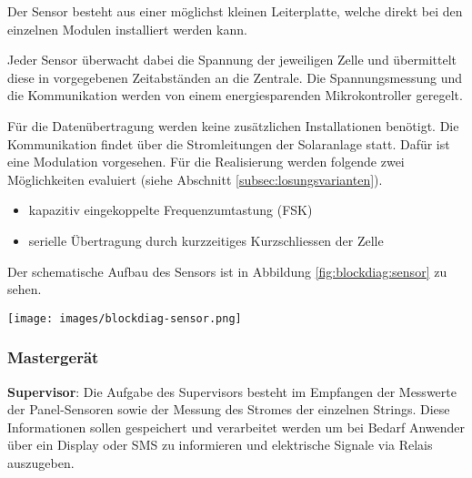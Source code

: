 \begin{minipage}[c][][t]{.49\textwidth}
	Der Sensor besteht  aus einer m\"oglichst kleinen  Leiterplatte, welche direkt
	bei den  einzelnen Modulen installiert  werden kann.

	Jeder  Sensor  \"uberwacht  dabei  die   Spannung  der  jeweiligen  Zelle  und
	\"ubermittelt  diese  in  vorgegebenen Zeitabst\"anden  an  die  Zentrale. Die
	Spannungsmessung  und  die  Kommunikation werden  von  einem  energiesparenden
	Mikrokontroller geregelt.

	F\"ur  die  Daten\"ubertragung   werden  keine  zus\"atzlichen  Installationen
	ben\"otigt. Die   Kommunikation   findet   \"uber   die   Stromleitungen   der
	Solaranlage   statt. Daf\"ur  ist   eine   Modulation  vorgesehen. F\"ur   die
	Realisierung werden  folgende zwei M\"oglichkeiten evaluiert  (siehe Abschnitt
	\ref{subsec:losungsvarianten}).

	\begin{itemize}
		\item
			kapazitiv eingekoppelte Frequenzumtastung (FSK)
		\item
			serielle \"Ubertragung durch kurzzeitiges Kurzschliessen der Zelle
	\end{itemize}

	Der     schematische    Aufbau     des     Sensors     ist    in     Abbildung
	\ref{fig:blockdiag:sensor} zu sehen.
\end{minipage}
\hspace*{0.02\textwidth}
\begin{minipage}[c][][t]{.49\textwidth}
		\centering
		\texttt{[image: images/blockdiag-sensor.png]}
		\label{fig:blockdiag:sensor}
\end{minipage}


\clearpage
\subsubsection{Masterger\"at}

\textbf{Supervisor}:
Die  Aufgabe   des  Supervisors  besteht   im  Empfangen  der   Messwerte  der
Panel-Sensoren  sowie der  Messung  des Stromes  der einzelnen  Strings. Diese
Informationen sollen gespeichert und verarbeitet werden um bei Bedarf Anwender
\"uber ein Display oder SMS zu  informieren und elektrische Signale via Relais
auszugeben.

